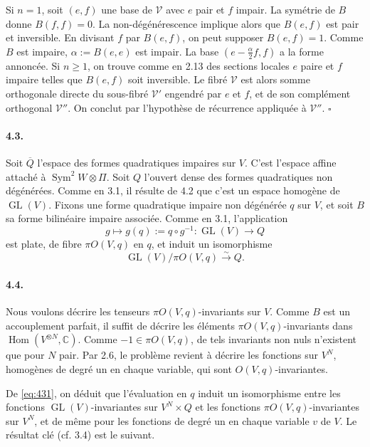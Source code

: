 \documentclass[11pt]{article}
\newcommand{\C}{\mathbb C}
\newcommand{\Hom}{\operatorname{Hom}}
\newcommand{\GL}{\operatorname{GL}}
\newcommand{\Sym}{\operatorname{Sym}}
\newcommand{\barQ}{\overline Q}
\begin{document}
Si $n=1$, soit $(e,f)$ une base de $\mathcal V$ avec $e$ pair et $f$ impair. La symétrie de $B$ donne $B(f,f)=0$. La non-dégénérescence implique alors que $B(e,f)$ est pair et inversible. En divisant $f$ par $B(e,f)$, on peut supposer $B(e,f)=1$. Comme $B$ est impaire, $\alpha:=B(e,e)$ est impair. La base $(e-\frac{\alpha}{2}f,f)$ a la forme annoncée. Si $n\ge1$, on trouve comme en 2.13 des sections locales $e$ paire et $f$ impaire telles que $B(e,f)$ soit inversible. Le fibré $\mathcal V$ est alors somme orthogonale directe du sous-fibré $\mathcal V'$ engendré par $e$ et $f$, et de son complément orthogonal $\mathcal V''$. On conclut par l'hypothèse de récurrence appliquée à $\mathcal V''$. \hfill $\square$

\paragraph{4.3.}
Soit $\barQ$ l'espace des formes quadratiques impaires sur $V$. C'est l'espace affine attaché à $\Sym^2W\otimes\Pi$. Soit $Q$ l'ouvert dense des formes quadratiques non dégénérées. Comme en 3.1, il résulte de 4.2 que c'est un espace homogène de $\GL(V)$. Fixons une forme quadratique impaire non dégénérée $q$ sur $V$, et soit $B$ sa forme bilinéaire impaire associée. Comme en 3.1, l'application
\[
g\longmapsto g(q):=q\circ g^{-1}:\GL(V)\longrightarrow Q
\]
est plate, de fibre $\pi O(V,q)$ en $q$, et induit un isomorphisme
\begin{equation}
\label{eq:431}
\GL(V)/\pi O(V,q)\xrightarrow{\sim}Q.
\end{equation}

\paragraph{4.4.}
Nous voulons décrire les tenseurs $\pi O(V,q)$-invariants sur $V$. Comme $B$ est un accouplement parfait, il suffit de décrire les éléments $\pi O(V,q)$-invariants dans $\Hom(V^{\otimes N},\C)$. Comme $-1\in\pi O(V,q)$, de tels invariants non nuls n'existent que pour $N$ pair. Par 2.6, le problème revient à décrire les fonctions sur $V^N$, homogènes de degré un en chaque variable, qui sont $O(V,q)$-invariantes.

De \eqref{eq:431}, on déduit que l'évaluation en $q$ induit un isomorphisme entre les fonctions $\GL(V)$-invariantes sur $V^N\times Q$ et les fonctions $\pi O(V,q)$-invariantes sur $V^N$, et de même pour les fonctions de degré un en chaque variable $v$ de $V$. Le résultat clé (cf. 3.4) est le suivant.
\end{document}
